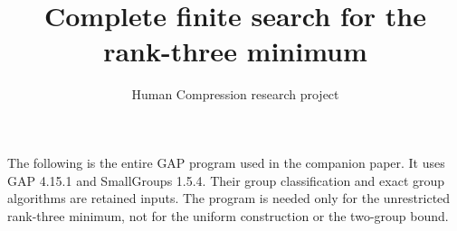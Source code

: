 \documentclass[11pt,a4paper]{article}
\title{Complete finite search for the rank-three minimum}
\author{Human Compression research project}
\date{}
\begin{document}
\maketitle
The following is the entire GAP program used in the companion paper.
It uses GAP 4.15.1 and SmallGroups 1.5.4. Their group classification and
exact group algorithms are retained inputs. The program is needed only
for the unrestricted rank-three minimum, not for the uniform construction
or the two-group bound.
\end{document}
